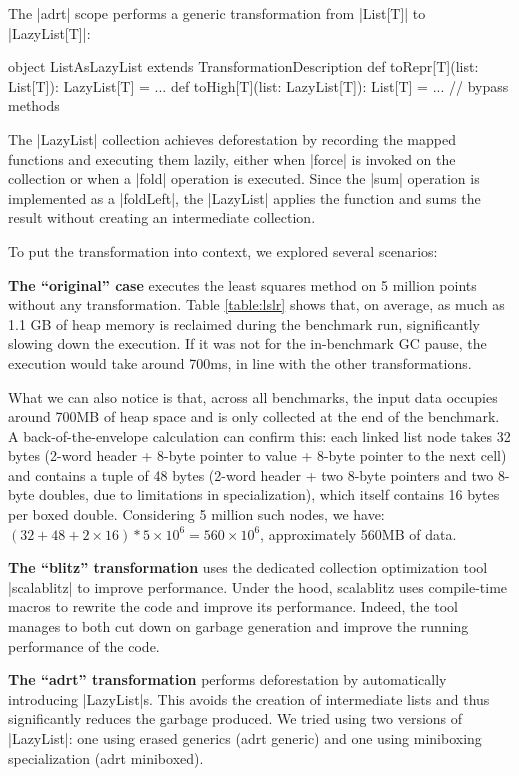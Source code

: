 \noindent
The |adrt| scope performs a generic transformation from |List[T]| to |LazyList[T]|:

\begin{lstlisting-nobreak}
object ListAsLazyList extends TransformationDescription {
  def toRepr[T](list: List[T]): LazyList[T] = ...
  def toHigh[T](list: LazyList[T]): List[T] = ...
  // bypass methods
}
\end{lstlisting-nobreak}

The |LazyList| collection achieves deforestation by recording the mapped functions and executing them lazily, either when |force| is invoked on the collection or when a |fold| operation is executed. Since the |sum| operation is implemented as a |foldLeft|, the |LazyList| applies the function and sums the result without creating an intermediate collection.

To put the transformation into context, we explored several scenarios:


\noindent
\textbf{The ``original'' case} executes the least squares method on 5 million points without any transformation. Table \ref{table:lslr} shows that, on average, as much as 1.1 GB of heap memory is reclaimed during the benchmark run, significantly slowing down the execution. If it was not for the in-benchmark GC pause, the execution would take around 700ms, in line with the other transformations.

\noindent
What we can also notice is that, across all benchmarks, the input data occupies around 700MB of heap space and is only collected at the end of the benchmark. A back-of-the-envelope calculation can confirm this: each linked list node takes 32 bytes (2-word header + 8-byte pointer to value + 8-byte pointer to the next cell) and contains a tuple of 48 bytes (2-word header + two 8-byte pointers and two 8-byte doubles, due to limitations in specialization), which itself contains 16 bytes per boxed double. Considering 5 million such nodes, we have: $(32 + 48 + 2 \times 16) * 5 \times 10^6 = 560 \times 10^6$, approximately 560MB of data.


\noindent
\textbf{The ``blitz'' transformation} uses the dedicated collection optimization tool |scalablitz| \cite{scalablitz, scalablitz-paper} to improve performance. Under the hood, scalablitz uses compile-time macros to rewrite the code and improve its performance. Indeed, the tool manages to both cut down on garbage generation and improve the running performance of the code.


\noindent
\textbf{The ``adrt'' transformation} performs deforestation by automatically introducing |LazyList|s. This avoids the creation of intermediate lists and thus significantly reduces the garbage produced. We tried using two versions of |LazyList|: one using erased generics (adrt generic) and one using miniboxing \cite{miniboxing} specialization (adrt miniboxed).

